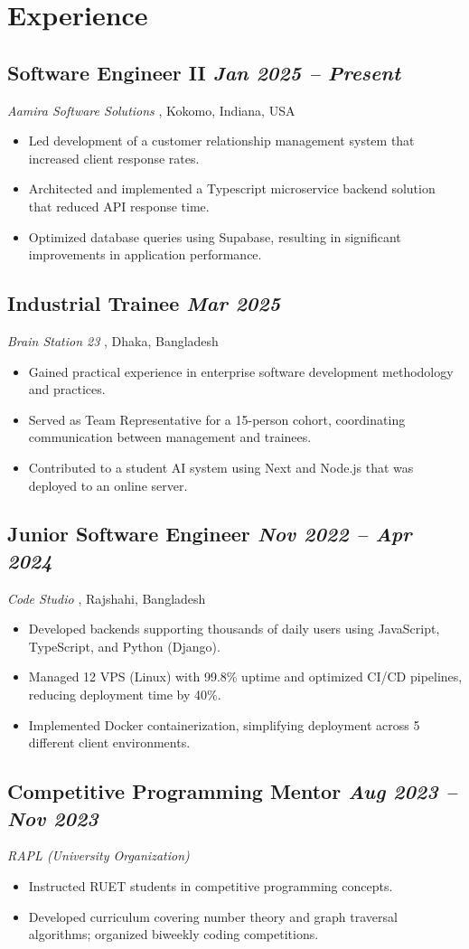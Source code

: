 \documentclass[10pt, a4paper]{article}
\newcommand{\urlAamira}{https://aamira.ca/}
\newcommand{\urlOutlier}{https://www.linkedin.com/company/try-outlier/}
\newcommand{\urlBrainStation}{https://brainstation-23.com/}
\newcommand{\urlCodeStudio}{https://www.linkedin.com/company/code-studio4/}
\newcommand{\datedsubsection}[2]{%
  \subsection*{#1 \hfill \small\textit{#2}}%
}
\newcommand{\resitem}[1]{\item #1} %
\begin{document}
\section{Experience}
\datedsubsection{Software Engineer II}{Jan 2025 -- Present}
\textit{Aamira Software Solutions} \href{\urlAamira}{\small\faExternalLink*}, Kokomo, Indiana, USA
\begin{itemize}
    \resitem{Led development of a customer relationship management system that increased client response rates.}
    \resitem{Architected and implemented a Typescript microservice backend solution that reduced API response time.}
    \resitem{Optimized database queries using Supabase, resulting in significant improvements in application performance.}
\end{itemize}
\datedsubsection{Industrial Trainee}{Mar 2025}
\textit{Brain Station 23} \href{\urlBrainStation}{\small\faExternalLink*}, Dhaka, Bangladesh
\begin{itemize}
    \resitem{Gained practical experience in enterprise software development methodology and practices.}
    \resitem{Served as Team Representative for a 15-person cohort, coordinating communication between management and trainees.}
    \resitem{Contributed to a student AI system using Next and Node.js that was deployed to an online server.}
\end{itemize}
\datedsubsection{Junior Software Engineer}{Nov 2022 -- Apr 2024}
\textit{Code Studio} \href{\urlCodeStudio}{\small\faExternalLink*}, Rajshahi, Bangladesh
\begin{itemize}
    \resitem{Developed backends supporting thousands of daily users using JavaScript, TypeScript, and Python (Django).}
    \resitem{Managed 12 VPS (Linux) with 99.8\% uptime and optimized CI/CD pipelines, reducing deployment time by 40\%.}
    \resitem{Implemented Docker containerization, simplifying deployment across 5 different client environments.}
\end{itemize}
\datedsubsection{Competitive Programming Mentor}{Aug 2023 -- Nov 2023}
\textit{RAPL (University Organization)}
\begin{itemize}
    \resitem{Instructed RUET students in competitive programming concepts.}
    \resitem{Developed curriculum covering number theory and graph traversal algorithms; organized biweekly coding competitions.}
\end{itemize}
\end{document}
